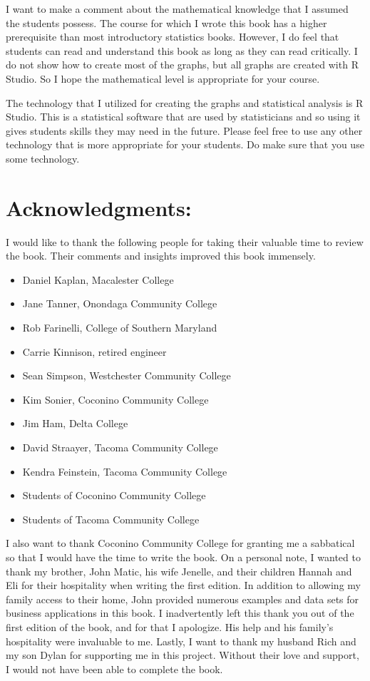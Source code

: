 \documentclass[]{book}
\providecommand{\tightlist}{%
  \setlength{\itemsep}{0pt}\setlength{\parskip}{0pt}}
\begin{document}
I want to make a comment about the mathematical knowledge that I assumed the students possess. The course for which I wrote this book has a higher prerequisite than most introductory statistics books. However, I do feel that students can read and understand this book as long as they can read critically. I do not show how to create most of the graphs, but all graphs are created with R Studio. So I hope the mathematical level is appropriate for your course.

The technology that I utilized for creating the graphs and statistical analysis is R Studio. This is a statistical software that are used by statisticians and so using it gives students skills they may need in the future. Please feel free to use any other technology that is more appropriate for your students. Do make sure that you use some technology.

\hypertarget{acknowledgments}{%
\section{Acknowledgments:}\label{acknowledgments}}

I would like to thank the following people for taking their valuable time to review the book. Their comments and insights improved this book immensely.

\begin{itemize}
\tightlist
\item
  Daniel Kaplan, Macalester College
\item
  Jane Tanner, Onondaga Community College
\item
  Rob Farinelli, College of Southern Maryland
\item
  Carrie Kinnison, retired engineer
\item
  Sean Simpson, Westchester Community College
\item
  Kim Sonier, Coconino Community College
\item
  Jim Ham, Delta College
\item
  David Straayer, Tacoma Community College
\item
  Kendra Feinstein, Tacoma Community College
\item
  Students of Coconino Community College
\item
  Students of Tacoma Community College
\end{itemize}

I also want to thank Coconino Community College for granting me a sabbatical so that I would have the time to write the book. On a personal note, I wanted to thank my brother, John Matic, his wife Jenelle, and their children Hannah and Eli for their hospitality when writing the first edition. In addition to allowing my family access to their home, John provided numerous examples and data sets for business applications in this book. I inadvertently left this thank you out of the first edition of the book, and for that I apologize. His help and his family's hospitality were invaluable to me.
Lastly, I want to thank my husband Rich and my son Dylan for supporting me in this project. Without their love and support, I would not have been able to complete the book.
\end{document}
